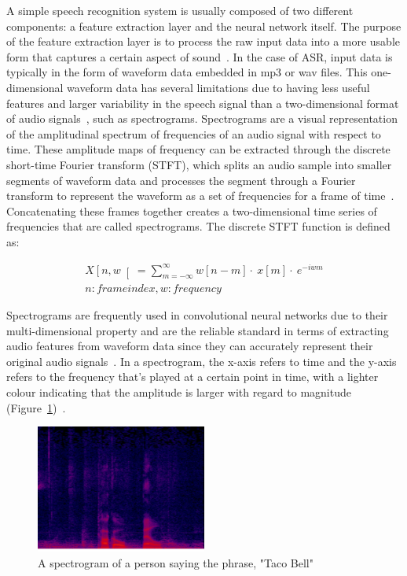 A simple speech recognition system is usually composed of two different components: a feature extraction layer and the neural network itself. The purpose of the feature extraction layer is to process the raw input data into a more usable form that captures a certain aspect of sound~\cite{janse_magre_kurzekar_deshmukh_2014}. In the case of ASR, input data is typically in the form of waveform data embedded in mp3 or wav files. This one-dimensional waveform data has several limitations due to having less useful features and larger variability in the speech signal than a two-dimensional format of audio signals~\cite{janse_magre_kurzekar_deshmukh_2014}, such as spectrograms. Spectrograms are a visual representation of the amplitudinal spectrum of frequencies of an audio signal with respect to time\cite{mahanta_padmanabhan_2021}. These amplitude maps of frequency can be extracted through the discrete short-time Fourier transform (STFT), which splits an audio sample into smaller segments of waveform data and processes the segment through a Fourier transform to represent the waveform as a set of frequencies for a frame of time~\cite{smith_2007}. Concatenating these frames together creates a two-dimensional time series of frequencies that are called spectrograms. The discrete STFT function is defined as:

\begin{align*}
    X\left[n,w\right[ = \sum_{m=-\infty}^{\infty}w[n-m]\cdot~x[m]\cdot~e^{-iwm}\\
    n: frame index, w: frequency
\end{align*}

Spectrograms are frequently used in convolutional neural networks due to their multi-dimensional property and are the reliable standard in terms of extracting audio features from waveform data since they can accurately represent their original audio signals~\cite{green_2018}. In a spectrogram, the x-axis refers to time and the y-axis refers to the frequency that’s played at a certain point in time, with a lighter colour indicating that the amplitude is larger with regard to magnitude (Figure~\ref{fig:Spectrogram})~\cite{green_2018}.

\begin{figure}[th]
    \centering
    \includegraphics[width=0.5\textwidth]{Figures/tacobell.png}
    \decoRule
    \caption[Spectrogram]{A spectrogram of a person saying the phrase, "Taco Bell"}
    \label{fig:Spectrogram}
\end{figure}


